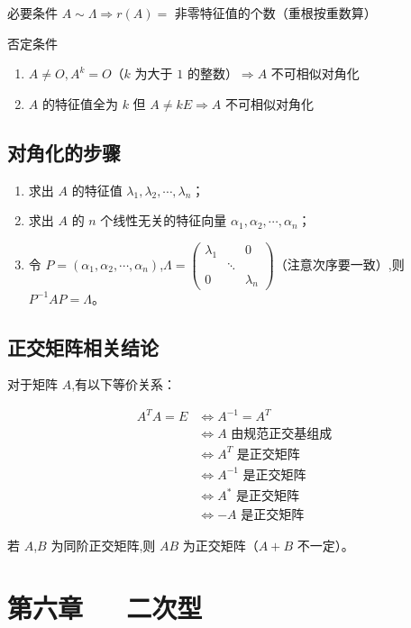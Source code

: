 \documentclass[UTF8]{ctexart}
\theoremstyle{remark}
\begin{document}
	必要条件
	\(A\sim \Lambda \Rightarrow r(A) =\) 非零特征值的个数（重根按重数算）
	
	否定条件
	\begin{enumerate}
		\item \(A\neq O, A^k = O\)（\(k\) 为大于 \(1\) 的整数）\(\Rightarrow A\) 不可相似对角化
		\item \(A\) 的特征值全为 \(k\) 但 \(A\neq kE \Rightarrow A\) 不可相似对角化
	\end{enumerate}
	
	\subsection{对角化的步骤}
	\begin{enumerate}
		\item 求出 \(A\) 的特征值 \(\lambda_1, \lambda_2, \cdots, \lambda_n\)；
		\item 求出 \(A\) 的 \(n\) 个线性无关的特征向量 \(\alpha_1, \alpha_2, \cdots, \alpha_n\)；
		\item 令 \(P = (\alpha_1, \alpha_2, \cdots, \alpha_n)\),\(\Lambda = \begin{pmatrix}
			\lambda_1 & & 0 \\
			& \ddots & \\
			0 & & \lambda_n
		\end{pmatrix}\)（注意次序要一致）,则 \(P^{-1}AP = \Lambda\)。
	\end{enumerate}
	
	\subsection{正交矩阵相关结论}
	对于矩阵 \(A\),有以下等价关系：
	
	\begin{align*}
		A^TA = E &\Leftrightarrow A^{-1} = A^T\\
		&\Leftrightarrow A\text{ 由规范正交基组成}\\
		&\Leftrightarrow A^T\text{ 是正交矩阵}\\
		&\Leftrightarrow A^{-1}\text{ 是正交矩阵}\\
		&\Leftrightarrow A^*\text{ 是正交矩阵}\\
		&\Leftrightarrow -A\text{ 是正交矩阵}
	\end{align*}
	
	若 \(A\),\(B\) 为同阶正交矩阵,则 \(AB\) 为正交矩阵（\(A + B\) 不一定）。
	
	\section{第六章~~~二次型}
\end{document}
